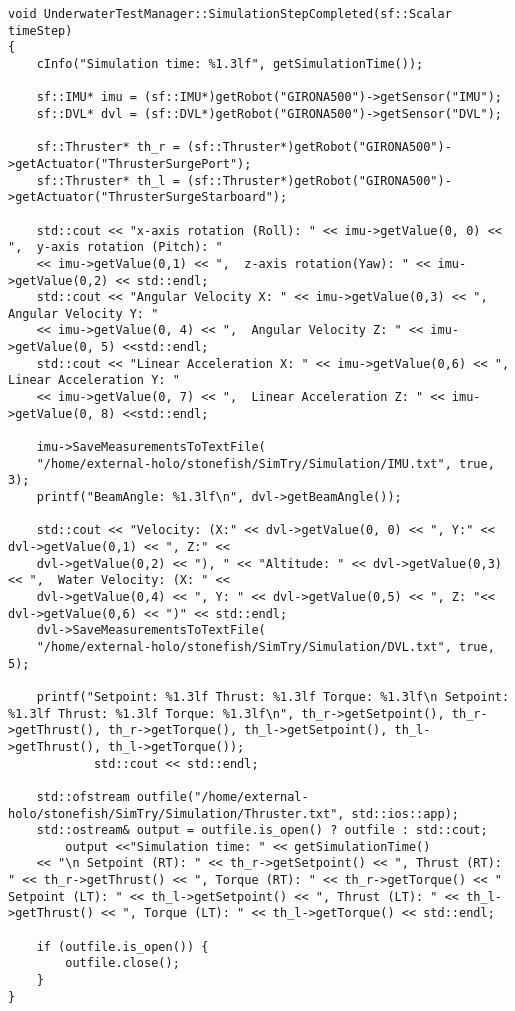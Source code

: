 \documentclass[]{article}
\begin{document}
		\begin{lstlisting}[frame=single]	
void UnderwaterTestManager::SimulationStepCompleted(sf::Scalar timeStep)
{
	cInfo("Simulation time: %1.3lf", getSimulationTime());
			
	sf::IMU* imu = (sf::IMU*)getRobot("GIRONA500")->getSensor("IMU");
	sf::DVL* dvl = (sf::DVL*)getRobot("GIRONA500")->getSensor("DVL");
			
	sf::Thruster* th_r = (sf::Thruster*)getRobot("GIRONA500")->getActuator("ThrusterSurgePort");
	sf::Thruster* th_l = (sf::Thruster*)getRobot("GIRONA500")->getActuator("ThrusterSurgeStarboard");
			
	std::cout << "x-axis rotation (Roll): " << imu->getValue(0, 0) << ",  y-axis rotation (Pitch): "
	<< imu->getValue(0,1) << ",  z-axis rotation(Yaw): " << imu->getValue(0,2) << std::endl;
	std::cout << "Angular Velocity X: " << imu->getValue(0,3) << ",  Angular Velocity Y: "
	<< imu->getValue(0, 4) << ",  Angular Velocity Z: " << imu->getValue(0, 5) <<std::endl;
	std::cout << "Linear Acceleration X: " << imu->getValue(0,6) << ",  Linear Acceleration Y: "
	<< imu->getValue(0, 7) << ",  Linear Acceleration Z: " << imu->getValue(0, 8) <<std::endl;
			
	imu->SaveMeasurementsToTextFile(
	"/home/external-holo/stonefish/SimTry/Simulation/IMU.txt", true, 3);
	printf("BeamAngle: %1.3lf\n", dvl->getBeamAngle());
			
	std::cout << "Velocity: (X:" << dvl->getValue(0, 0) << ", Y:" << dvl->getValue(0,1) << ", Z:" <<
	dvl->getValue(0,2) << "), " << "Altitude: " << dvl->getValue(0,3) << ",  Water Velocity: (X: " <<
	dvl->getValue(0,4) << ", Y: " << dvl->getValue(0,5) << ", Z: "<< dvl->getValue(0,6) << ")" << std::endl;	
	dvl->SaveMeasurementsToTextFile(
	"/home/external-holo/stonefish/SimTry/Simulation/DVL.txt", true, 5);
			
	printf("Setpoint: %1.3lf Thrust: %1.3lf Torque: %1.3lf\n Setpoint: %1.3lf Thrust: %1.3lf Torque: %1.3lf\n", th_r->getSetpoint(), th_r->getThrust(), th_r->getTorque(), th_l->getSetpoint(), th_l->getThrust(), th_l->getTorque());
			std::cout << std::endl;
			
	std::ofstream outfile("/home/external-holo/stonefish/SimTry/Simulation/Thruster.txt", std::ios::app);
	std::ostream& output = outfile.is_open() ? outfile : std::cout;
		output <<"Simulation time: " << getSimulationTime()
	<< "\n Setpoint (RT): " << th_r->getSetpoint() << ", Thrust (RT): " << th_r->getThrust() << ", Torque (RT): " << th_r->getTorque() << " Setpoint (LT): " << th_l->getSetpoint() << ", Thrust (LT): " << th_l->getThrust() << ", Torque (LT): " << th_l->getTorque() << std::endl;
			
	if (outfile.is_open()) {
		outfile.close();
	}
}
		
	\end{lstlisting}
	
\end{document}
